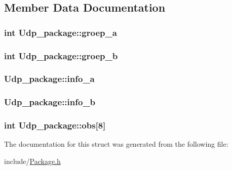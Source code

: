 \subsection{Member Data Documentation}
\hypertarget{structUdp__package_a970184a6e334fe29f4692718f271fdb0}{
\subsubsection[{groep\-\_\-a}]{\setlength{\rightskip}{0pt plus 5cm}int Udp\-\_\-package\-::groep\-\_\-a}}\label{structUdp__package_a970184a6e334fe29f4692718f271fdb0}
\hypertarget{structUdp__package_a8db8b9a082bf209e329b97a8a94cf690}{
\subsubsection[{groep\-\_\-b}]{\setlength{\rightskip}{0pt plus 5cm}int Udp\-\_\-package\-::groep\-\_\-b}}\label{structUdp__package_a8db8b9a082bf209e329b97a8a94cf690}
\hypertarget{structUdp__package_a6cb537db96ffd959c77f135e44cfba3e}{
\subsubsection[{info\-\_\-a}]{ Udp\-\_\-package\-::info\-\_\-a}}\label{structUdp__package_a6cb537db96ffd959c77f135e44cfba3e}
\hypertarget{structUdp__package_ae1e5f1d35dfdae47b8750cbf4181bcac}{
\subsubsection[{info\-\_\-b}]{ Udp\-\_\-package\-::info\-\_\-b}}\label{structUdp__package_ae1e5f1d35dfdae47b8750cbf4181bcac}
\hypertarget{structUdp__package_a9b33ca73a59acb03b87d840a2086de68}{
\subsubsection[{obs}]{\setlength{\rightskip}{0pt plus 5cm}int Udp\-\_\-package\-::obs\mbox{[}8\mbox{]}}}\label{structUdp__package_a9b33ca73a59acb03b87d840a2086de68}


The documentation for this struct was generated from the following file\-:\begin{DoxyCompactItemize}
\item 
include/\hyperlink{Package_8h}{Package.\-h}\end{DoxyCompactItemize}

